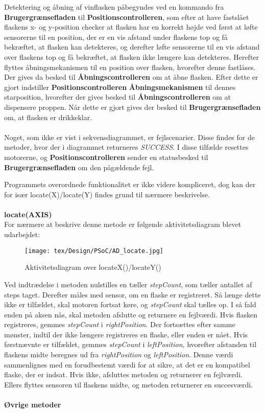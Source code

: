 \noindent Detektering og åbning af vinflasken påbegyndes ved en kommando fra \textbf{Brugergrænsefladen} til \textbf{Positionscontrolleren}, som efter at have fastslået flaskens x- og y-position checker at flasken har en korrekt højde ved først at løfte sensorerne til en position, der er en vis afstand under flaskens top og få bekræftet, at flasken kan detekteres, og derefter løfte sensorerne til en vis afstand over flaskens top og få bekræftet, at flasken ikke længere kan detekteres. Herefter flyttes åbningsmekanismen til en position over flasken, hvorefter denne fastlåses. Der gives da besked til \textbf{Åbningscontrolleren} om at åbne flasken. Efter dette er gjort indstiller \textbf{Positionscontrolleren} \textbf{Åbningsmekanismen} til dennes starposition, hvorefter der gives besked til \textbf{Åbningscontrolleren} om at dispensere proppen. Når dette er gjort gives der besked til \textbf{Brugergrænsefladen} om, at flasken er drikkeklar. \\
\\
Noget, som ikke er vist i sekvensdiagrammet, er fejlscenarier. Disse findes for de metoder, hvor der i diagrammet returneres \textit{SUCCESS}. I disse tilfælde resettes motorerne, og \textbf{Positionscontrolleren} sender en statusbesked til \textbf{Brugergrænsefladen} om den pågældende fejl.

Programmets overordnede funktionalitet er ikke videre kompliceret, dog kan der for især locate(X)/locate(Y) findes grund til nærmere beskrivelse.
\\
\\
\textbf{locate(AXIS)} \\
For nærmere at beskrive denne metode er følgende aktivitetsdiagram blevet udarbejdet: \\

\begin{figure}[H]
	\centerline{\texttt{[image: tex/Design/PSoC/AD\_locate.jpg]}}
	\caption{Aktivitetsdiagram over locateX()/locateY()}
	\label{AD_locate}
\end{figure}

Ved indtrædelse i metoden nulstilles en tæller \textit{stepCount}, som tæller antallet af steps taget. Derefter måles med sensor, om en flaske er registreret. Så længe dette ikke er tilfældet, skal motoren fortsat køre, og \textit{stepCount} skal tælles op. I så fald enden på aksen nås, skal metoden afslutte og returnere en fejlværdi. Hvis flasken registreres, gemmes \textit{stepCount} i \textit{rightPosition}. Der fortsættes efter samme mønster, indtil der ikke længere registreres en flaske, eller enden er nået. Hvis førstnævnte er tilfældet, gemmes \textit{stepCount} i \textit{leftPosition}, hvorefter afstanden til flaskens midte beregnes ud fra \textit{rightPosition} og \textit{leftPosition}. Denne værdi sammenlignes med en forudbestemt værdi for at sikre, at det er en kompatibel flaske, der er indsat. Hvis ikke, afsluttes metoden og returnerer en fejlværdi. Ellers flyttes sensoren til flaskens midte, og metoden returnerer en succesværdi.
\\
\\
\textbf{Øvrige metoder}

